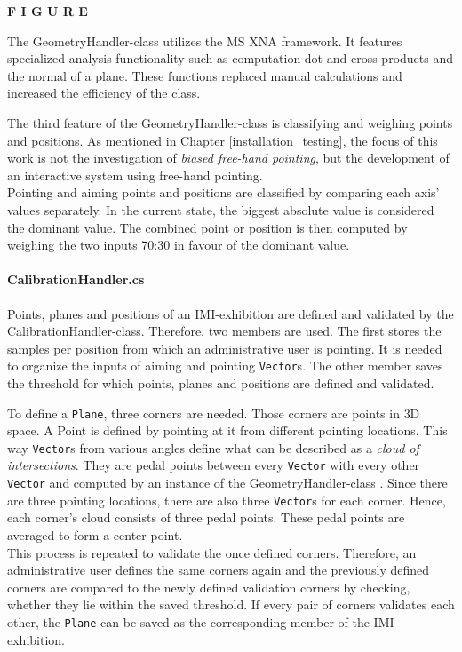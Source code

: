 \textbf{F I G U R E}

The GeometryHandler-class utilizes the \ac{MS} XNA framework. It features specialized analysis functionality such as computation dot and cross products and the normal of a plane. These functions replaced manual calculations and increased the efficiency of the class.

The third feature of the GeometryHandler-class is classifying and weighing points and positions. As mentioned in Chapter \ref{installation_testing}, the focus of this work is not the investigation of \textit{biased free-hand pointing}, but the development of an interactive system using free-hand pointing.
\\
Pointing and aiming points and positions are classified by comparing each axis' values separately. In the current state, the biggest absolute value is considered the dominant value. The combined point or position is then computed by weighing the two inputs 70:30 in favour of the dominant value.


\paragraph{CalibrationHandler.cs} Points, planes and positions of an \ac{IMI}-exhibition are defined and validated by the CalibrationHandler-class. Therefore, two members are used. The first stores the samples per position from which an administrative user is pointing. It is needed to organize the inputs of aiming and pointing \texttt{Vector}s. The other member saves the threshold for which points, planes and positions are defined and validated.

To define a \texttt{Plane}, three corners are needed. Those corners are points in \ac{3D} space. A Point is defined by pointing at it from different pointing locations. This way \texttt{Vector}s from various angles define what can be described as a \textit{cloud of intersections}. They are pedal points between every \texttt{Vector} with every other \texttt{Vector} and computed by an instance of the GeometryHandler-class . Since there are three pointing locations, there are also three \texttt{Vector}s for each corner. Hence, each corner's cloud consists of three pedal points. These pedal points are averaged to form a center point.
\\
This process is repeated to validate the once defined corners. Therefore, an administrative user defines the same corners again and the previously defined corners are compared to the newly defined validation corners by checking, whether they lie within the saved threshold. If every pair of corners validates each other, the \texttt{Plane} can be saved as the corresponding member of the \ac{IMI}-exhibition.

